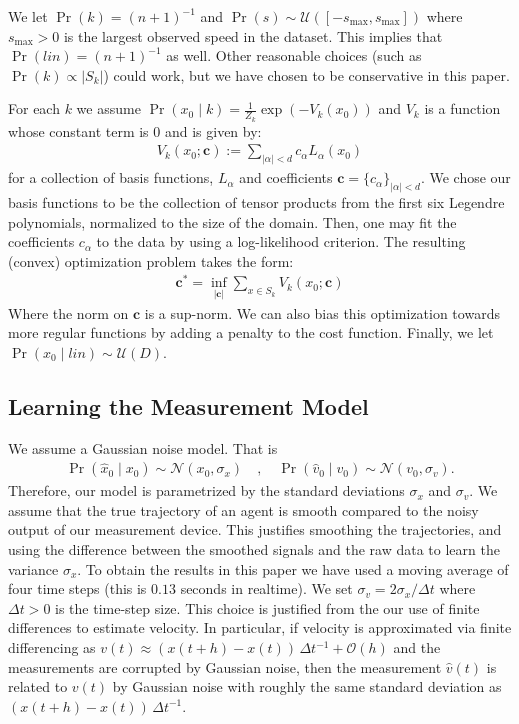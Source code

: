 \documentclass[letterpaper,10pt,conference]{ieeeconf}
\begin{document}
  We let $\Pr(k) = (n+1)^{-1}$ and $\Pr(s) \sim \mathcal{U}( [-s_{\max}, s_{\max} ] )$  where $s_{\max}>0$ is the largest observed speed in the dataset.  
  This implies that $\Pr(lin) = (n+1)^{-1}$ as well.
  Other reasonable choices (such as $\Pr(k) \propto | S_k|$) could work, but we have chosen to be conservative in this paper.
  
  For each $k$ we assume $\Pr( x_0 \mid k) = \frac{1}{Z_k} \exp( - V_k(x_0) )$ and $V_k$ is a function whose constant term is $0$ and is given by:
  \begin{align*}
  	V_k(x_0; \mathbf{c} ) := \sum_{|\alpha|< d} c_{\alpha} L_{\alpha}( x_0)
  \end{align*}
  for a collection of basis functions, $L_{\alpha}$ and coefficients $\mathbf{c} = \{ c_{\alpha} \}_{|\alpha| < d}$.
  We chose our basis functions to be the collection of tensor products from the first six Legendre polynomials, normalized to the size of the domain.
  Then, one may fit the coefficients $c_{\alpha}$ to the data by using a log-likelihood criterion.
  The resulting (convex) optimization problem takes the form:
  \begin{align*}
  	\mathbf{c}^* = \inf_{ |\mathbf{c}| } \sum_{x \in S_k} V_k( x_0; \mathbf{c})
  \end{align*}
  Where the norm on $\mathbf{c}$ is a sup-norm.
  We can also bias this optimization towards more regular functions by adding a penalty to the cost function.
    Finally, we let $\Pr( x_0 \mid lin) \sim \mathcal{U}(D)$.
  
  \subsection{Learning the Measurement Model}
  We assume a Gaussian noise model.  
  That is
  \begin{align*}
  	\Pr( \hat{x}_0 \mid x_0 ) \sim \mathcal{N}( x_0 , \sigma_x) \quad, \quad \Pr( \hat{v}_0 \mid v_0 ) \sim \mathcal{N}( v_0, \sigma_v).
  \end{align*}
  Therefore, our model is parametrized by the standard deviations $\sigma_x$ and $\sigma_v$.
  We assume that the true trajectory of an agent is smooth compared to the noisy output of our measurement device.
  This justifies smoothing the trajectories, and using the difference between the smoothed signals and the raw data to learn the variance $\sigma_x$.
  To obtain the results in this paper we have used a moving average of four time steps (this is $0.13$ seconds in realtime).
  We set $\sigma_v = 2 \sigma_x / \Delta t$ where $\Delta t > 0$ is the time-step size.  
  This choice is justified from the our use of finite differences to estimate velocity.
  In particular, if velocity is approximated via finite differencing as $v(t) \approx (x(t+h) - x(t))\,\Delta t^{-1} + \mathcal{O}(h)$ and the measurements are corrupted by Gaussian noise, then the measurement $\hat{v}(t)$ is related to $v(t)$ by Gaussian noise with roughly the same standard deviation as $(x(t+h) - x(t))\,\Delta t^{-1}$.
  
\end{document}
